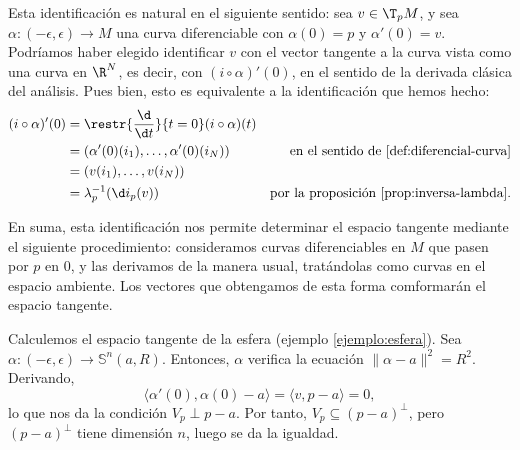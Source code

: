 Esta identificación es natural en el siguiente sentido: sea $v\in \T_{p}M$, y
sea $\alpha:(-\epsilon,\epsilon)\to M$ una curva diferenciable con $\alpha(0)=p$
y $\alpha'(0)=v$. Podríamos haber elegido identificar $v$ con el vector tangente
a la curva vista como una curva en $\R^{N}$, es decir, con $(i\circ\alpha)'(0)$,
en el sentido de la derivada clásica del análisis. Pues bien, esto es
equivalente a la identificación que hemos hecho:
\begin{align*}
  (i\circ\alpha)'(0) & = \restr{\frac{\d}{\d t}}{t = 0}(i\circ\alpha)(t) \\
                     & = (\alpha'(0)(i_{1}),\dots,\alpha'(0)(i_{N})) & \text{en
                                                                       el
                                                                       sentido
                                                                       de \ref{def:diferencial-curva}} \\
                     & = (v(i_{1}),\dots,v(i_{N})) \\
                     & = \lambda_{p}^{-1}(\d i_{p}(v)) & \text{por la
                                                          proposición \ref{prop:inversa-lambda}}.
\end{align*}

En suma, esta identificación nos permite determinar el espacio tangente mediante
el siguiente procedimiento: consideramos curvas diferenciables en $M$ que pasen
por $p$ en $0$, y las derivamos de la manera usual, tratándolas como curvas en
el espacio ambiente. Los vectores que obtengamos de esta forma comformarán el
espacio tangente.

\begin{ejemplo}[Esfera]
Calculemos el espacio tangente de la esfera (ejemplo \ref{ejemplo:esfera}). Sea
$\alpha :(-\epsilon,\epsilon)\to\mathbb{S}^{n}(a,R)$. Entonces, $\alpha$
verifica la ecuación $\|\alpha-a\|^{2} = R^{2}$. Derivando,
\[
  \langle \alpha'(0), \alpha(0)-a \rangle = \langle v, p-a \rangle = 0
,\]
lo que nos da la condición $V_{p} \perp p-a$. Por tanto, $V_{p}\subseteq
(p-a)^{\perp}$, pero $(p-a)^{\perp}$ tiene dimensión $n$, luego se da la igualdad.
\end{ejemplo}

